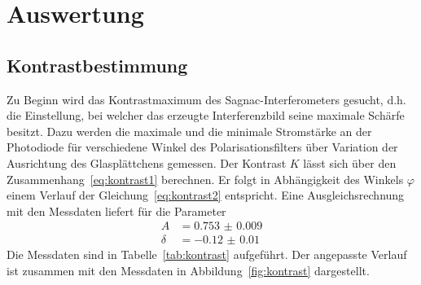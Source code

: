 \section{Auswertung}
\label{sec:auswertung}



\subsection{Kontrastbestimmung}
Zu Beginn wird das Kontrastmaximum des Sagnac-Interferometers gesucht, d.h. die
Einstellung, bei welcher das erzeugte Interferenzbild seine maximale Schärfe
besitzt. Dazu werden die maximale und die minimale Stromstärke an der
Photodiode für verschiedene Winkel des Polarisationsfilters über Variation der
Ausrichtung des Glasplättchens gemessen. Der Kontrast $K$ lässt sich
über den Zusammenhang~\eqref{eq:kontrast1} berechnen. Er folgt in Abhängigkeit
des Winkels $\varphi$ einem Verlauf der Gleichung~\eqref{eq:kontrast2}
entspricht. Eine Ausgleichsrechnung mit den Messdaten liefert für die Parameter
\begin{align}
  A&=\num{0.753(9)} \\
  \delta&=\num{-0.12(1)}
\end{align}
Die Messdaten sind in Tabelle~\ref{tab:kontrast} aufgeführt. Der angepasste
Verlauf ist zusammen mit den Messdaten in Abbildung~\ref{fig:kontrast}
dargestellt.

